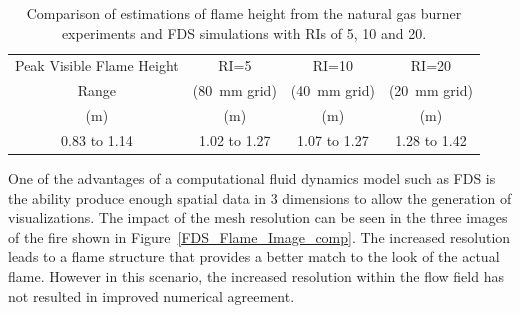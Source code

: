 \documentclass[twoside]{uocthesis}
\begin{document}
{\begin{table}[h]
  \small
  \centering
  \begin{tabular}{|c|c|c|c|}
    \hline Peak Visible Flame Height   	& RI=5       		& RI=10      		& RI=20  \\
    Range          						&  (80~mm grid)  	&  (40~mm grid)  	&  (20~mm grid)  \\
    (m)     							& (m) 				& (m) 				& (m)  			 \\ 
    \hline 0.83 to 1.14         		& 1.02 to 1.27      & 1.07 to 1.27      & 1.28 to 1.42   \\
    \hline
  \end{tabular}
  \caption[Comparison of estimations of flame height from the natural gas burner experiments and FDS simulations with RIs of 5, 10 and 20.]{Comparison of estimations of flame height from the natural gas burner experiments and FDS simulations with RIs of 5, 10 and 20.}
  \label{tab:FDS_FH}
\end{table}

One of the advantages of a computational fluid dynamics model such as FDS is the ability produce enough spatial data in 3 dimensions to allow the generation of visualizations.  The impact of the mesh resolution can be seen in the three images of the fire shown in Figure~\ref{FDS_Flame_Image_comp}.  The increased resolution leads to a flame structure that provides a better match to the look of the actual flame.  However in this scenario, the increased resolution within the flow field has not resulted in improved numerical agreement.

}
\end{document}
